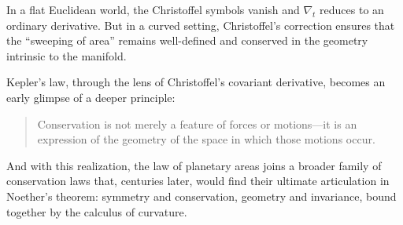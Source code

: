 In a flat Euclidean world, the Christoffel symbols vanish and \( \nabla_t \) reduces to an ordinary derivative. But in a curved setting, Christoffel’s correction ensures that the “sweeping of area” remains well-defined and conserved in the geometry intrinsic to the manifold.

\bigskip

Kepler’s law, through the lens of Christoffel’s covariant derivative, becomes an early glimpse of a deeper principle:

\begin{quote}
Conservation is not merely a feature of forces or motions—it is an expression of the geometry of the space in which those motions occur.
\end{quote}

And with this realization, the law of planetary areas joins a broader family of conservation laws that, centuries later, would find their ultimate articulation in Noether’s theorem:  
symmetry and conservation, geometry and invariance, bound together by the calculus of curvature.

